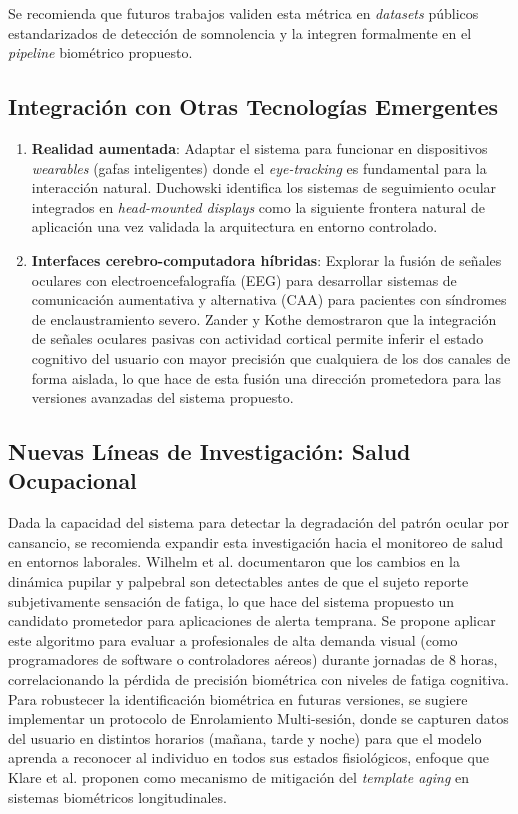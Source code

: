 Se recomienda que futuros trabajos validen esta métrica en \textit{datasets} públicos estandarizados de detección de somnolencia y la integren formalmente en el \textit{pipeline} biométrico propuesto.


\subsection{Integración con Otras Tecnologías Emergentes}

\begin{enumerate}
	\item \textbf{Realidad aumentada}: Adaptar el sistema para funcionar en dispositivos \textit{wearables} (gafas inteligentes) donde el \textit{eye-tracking} es fundamental para la interacción natural.
	Duchowski \cite{duchowski2017} identifica los sistemas de seguimiento ocular integrados en \textit{head-mounted displays} como la siguiente frontera natural de aplicación una vez validada la arquitectura en entorno controlado.
	\item \textbf{Interfaces cerebro-computadora híbridas}: Explorar la fusión de señales oculares con electroencefalografía (EEG) para desarrollar sistemas de comunicación aumentativa y alternativa (CAA) para pacientes con síndromes de enclaustramiento severo.
	Zander y Kothe \cite{zander2011towards} demostraron que la integración de señales oculares pasivas con actividad cortical permite inferir el estado cognitivo del usuario con mayor precisión que cualquiera de los dos canales de forma aislada, lo que hace de esta fusión una dirección prometedora para las versiones avanzadas del sistema propuesto.
\end{enumerate}

\subsection{Nuevas Líneas de Investigación: Salud Ocupacional}

Dada la capacidad del sistema para detectar la degradación del patrón ocular por cansancio, se recomienda expandir esta investigación hacia el monitoreo de salud en entornos laborales.
Wilhelm et al. \cite{wilhelm2001pupil} documentaron que los cambios en la dinámica pupilar y palpebral son detectables antes de que el sujeto reporte subjetivamente sensación de fatiga, lo que hace del sistema propuesto un candidato prometedor para aplicaciones de alerta temprana.
Se propone aplicar este algoritmo para evaluar a profesionales de alta demanda visual (como programadores de software o controladores aéreos) durante jornadas de 8 horas, correlacionando la pérdida de precisión biométrica con niveles de fatiga cognitiva.
Para robustecer la identificación biométrica en futuras versiones, se sugiere implementar un protocolo de Enrolamiento Multi-sesión, donde se capturen datos del usuario en distintos horarios (mañana, tarde y noche) para que el modelo aprenda a reconocer al individuo en todos sus estados fisiológicos, enfoque que Klare et al.
\cite{klare2012face} proponen como mecanismo de mitigación del \textit{template aging} en sistemas biométricos longitudinales.
